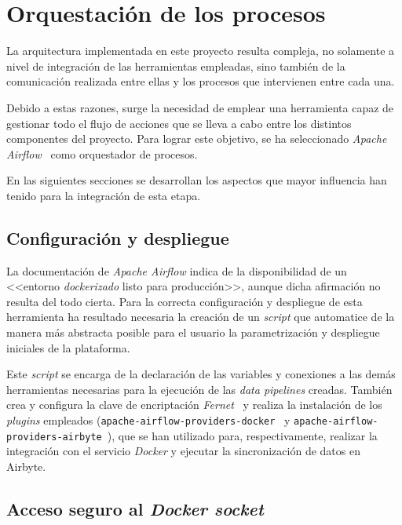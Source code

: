 \section{Orquestación de los procesos}

La arquitectura implementada en este proyecto resulta compleja, no solamente a nivel de integración de las herramientas empleadas, sino también de la comunicación realizada entre ellas y los procesos que intervienen entre cada una.

Debido a estas razones, surge la necesidad de emplear una herramienta capaz de gestionar todo el flujo de acciones que se lleva a cabo entre los distintos componentes del proyecto. Para lograr este objetivo, se ha seleccionado \textit{Apache Airflow}~\cite{apacheAirflow} como orquestador de procesos.

En las siguientes secciones se desarrollan los aspectos que mayor influencia han tenido para la integración de esta etapa.

\subsection{Configuración y despliegue}

La documentación de \textit{Apache Airflow} indica de la disponibilidad de un <<entorno \textit{dockerizado} listo para producción>>, aunque dicha afirmación no resulta del todo cierta. Para la correcta configuración y despliegue de esta herramienta ha resultado necesaria la creación de un \textit{script} que automatice de la manera más abstracta posible para el usuario la parametrización y despliegue iniciales de la plataforma.

Este \textit{script} se encarga de la declaración de las variables y conexiones a las demás herramientas necesarias para la ejecución de las \textit{data pipelines} creadas. También crea y configura la clave de encriptación \textit{Fernet}~\cite{fernetKey} y realiza la instalación de los \textit{plugins} empleados (\texttt{apache-airflow-providers-docker}~\cite{airflowDocker} y \texttt{apache-airflow-providers-airbyte}~\cite{airflowAirbyte}), que se han utilizado para, respectivamente, realizar la integración con el servicio \textit{Docker} y ejecutar la sincronización de datos en Airbyte.

\subsection{Acceso seguro al \textit{Docker socket}}

